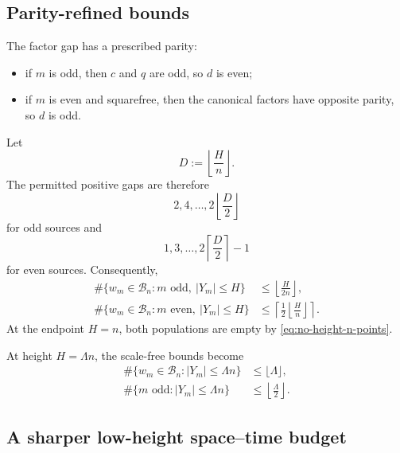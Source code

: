 \documentclass[11pt]{article}
\theoremstyle{definition}
\theoremstyle{remark}
\newcommand{\1}{\mathbf{1}}
\begin{document}
\subsection{Parity-refined bounds}

The factor gap has a prescribed parity:
\begin{itemize}[leftmargin=1.7em]
\item if $m$ is odd, then $c$ and $q$ are odd, so $d$ is even;
\item if $m$ is even and squarefree, then the canonical factors have
      opposite parity, so $d$ is odd.
\end{itemize}
Let
\begin{equation}
 D:=\left\lfloor\frac{H}{n}\right\rfloor.
 \label{eq:D-height}
\end{equation}
The permitted positive gaps are therefore
\[
 2,4,\ldots,2\left\lfloor\frac D2\right\rfloor
\]
for odd sources and
\[
 1,3,\ldots,2\left\lceil\frac D2\right\rceil-1
\]
for even sources.  Consequently,
\begin{align}
 \#\{w_m\in\mathscr B_n:m\text{ odd},\ |Y_m|\le H\}
 &\le
 \left\lfloor\frac{H}{2n}\right\rfloor,
 \label{eq:odd-parity-clustering}\\
 \#\{w_m\in\mathscr B_n:m\text{ even},\ |Y_m|\le H\}
 &\le
 \left\lceil\frac{1}{2}
 \left\lfloor\frac{H}{n}\right\rfloor\right\rceil.
 \label{eq:even-parity-clustering}
\end{align}
At the endpoint $H=n$, both populations are empty by
\cref{eq:no-height-n-points}.

At height $H=\Lambda n$, the scale-free bounds become
\begin{align}
 \#\{w_m\in\mathscr B_n:|Y_m|\le\Lambda n\}
 &\le\lfloor\Lambda\rfloor,
 \label{eq:constant-occupancy}\\
 \#\{m\text{ odd}:|Y_m|\le\Lambda n\}
 &\le\left\lfloor\frac{\Lambda}{2}\right\rfloor.
 \label{eq:constant-odd-occupancy}
\end{align}

\subsection{A sharper low-height space--time budget}
\end{document}
